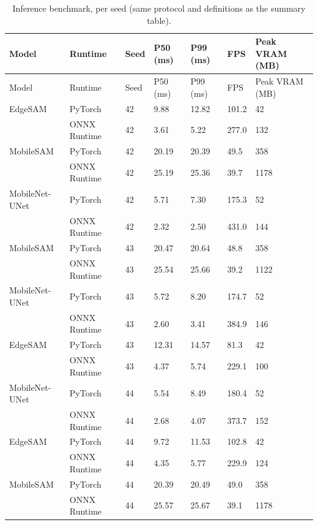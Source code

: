 \documentclass[10pt]{article}
\begin{document}
\begin{landscape}
{\scriptsize
\begin{longtable}{lllllll}
\caption{Inference benchmark, per seed (same protocol and definitions as the summary table).}\label{tab:bench_seeds}\\
\toprule
Model & Runtime & Seed & P50 (ms) & P99 (ms) & FPS & Peak VRAM (MB) \\
\midrule
\endfirsthead
\toprule
Model & Runtime & Seed & P50 (ms) & P99 (ms) & FPS & Peak VRAM (MB) \\
\midrule
\endhead
\bottomrule
\endfoot
EdgeSAM & PyTorch & 42 & 9.88 & 12.82 & 101.2 & 42 \\
 & ONNX Runtime & 42 & 3.61 & 5.22 & 277.0 & 132 \\
MobileSAM & PyTorch & 42 & 20.19 & 20.39 & 49.5 & 358 \\
 & ONNX Runtime & 42 & 25.19 & 25.36 & 39.7 & 1178 \\
MobileNet-UNet & PyTorch & 42 & 5.71 & 7.30 & 175.3 & 52 \\
 & ONNX Runtime & 42 & 2.32 & 2.50 & 431.0 & 144 \\
MobileSAM & PyTorch & 43 & 20.47 & 20.64 & 48.8 & 358 \\
 & ONNX Runtime & 43 & 25.54 & 25.66 & 39.2 & 1122 \\
MobileNet-UNet & PyTorch & 43 & 5.72 & 8.20 & 174.7 & 52 \\
 & ONNX Runtime & 43 & 2.60 & 3.41 & 384.9 & 146 \\
EdgeSAM & PyTorch & 43 & 12.31 & 14.57 & 81.3 & 42 \\
 & ONNX Runtime & 43 & 4.37 & 5.74 & 229.1 & 100 \\
MobileNet-UNet & PyTorch & 44 & 5.54 & 8.49 & 180.4 & 52 \\
 & ONNX Runtime & 44 & 2.68 & 4.07 & 373.7 & 152 \\
EdgeSAM & PyTorch & 44 & 9.72 & 11.53 & 102.8 & 42 \\
 & ONNX Runtime & 44 & 4.35 & 5.77 & 229.9 & 124 \\
MobileSAM & PyTorch & 44 & 20.39 & 20.49 & 49.0 & 358 \\
 & ONNX Runtime & 44 & 25.57 & 25.67 & 39.1 & 1178 \\
\end{longtable}
}


\end{landscape}
\end{document}

